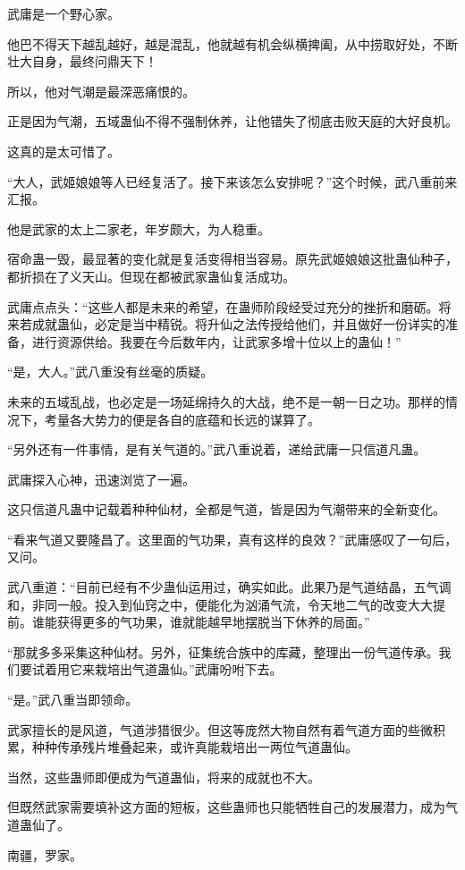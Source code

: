 \begin{this_body}
武庸是一个野心家。

他巴不得天下越乱越好，越是混乱，他就越有机会纵横捭阖，从中捞取好处，不断壮大自身，最终问鼎天下！

所以，他对气潮是最深恶痛恨的。

正是因为气潮，五域蛊仙不得不强制休养，让他错失了彻底击败天庭的大好良机。

这真的是太可惜了。

“大人，武姬娘娘等人已经复活了。接下来该怎么安排呢？”这个时候，武八重前来汇报。

他是武家的太上二家老，年岁颇大，为人稳重。

宿命蛊一毁，最显著的变化就是复活变得相当容易。原先武姬娘娘这批蛊仙种子，都折损在了义天山。但现在都被武家蛊仙复活成功。

武庸点点头：“这些人都是未来的希望，在蛊师阶段经受过充分的挫折和磨砺。将来若成就蛊仙，必定是当中精锐。将升仙之法传授给他们，并且做好一份详实的准备，进行资源供给。我要在今后数年内，让武家多增十位以上的蛊仙！”

“是，大人。”武八重没有丝毫的质疑。

未来的五域乱战，也必定是一场延绵持久的大战，绝不是一朝一日之功。那样的情况下，考量各大势力的便是各自的底蕴和长远的谋算了。

“另外还有一件事情，是有关气道的。”武八重说着，递给武庸一只信道凡蛊。

武庸探入心神，迅速浏览了一遍。

这只信道凡蛊中记载着种种仙材，全都是气道，皆是因为气潮带来的全新变化。

“看来气道又要隆昌了。这里面的气功果，真有这样的良效？”武庸感叹了一句后，又问。

武八重道：“目前已经有不少蛊仙运用过，确实如此。此果乃是气道结晶，五气调和，非同一般。投入到仙窍之中，便能化为汹涌气流，令天地二气的改变大大提前。谁能获得更多的气功果，谁就能越早地摆脱当下休养的局面。”

“那就多多采集这种仙材。另外，征集统合族中的库藏，整理出一份气道传承。我们要试着用它来栽培出气道蛊仙。”武庸吩咐下去。

“是。”武八重当即领命。

武家擅长的是风道，气道涉猎很少。但这等庞然大物自然有着气道方面的些微积累，种种传承残片堆叠起来，或许真能栽培出一两位气道蛊仙。

当然，这些蛊师即便成为气道蛊仙，将来的成就也不大。

但既然武家需要填补这方面的短板，这些蛊师也只能牺牲自己的发展潜力，成为气道蛊仙了。

南疆，罗家。


\end{this_body}
